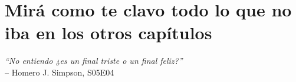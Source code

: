 \documentclass[main.tex]{subfiles}
\begin{document}
	\onlyinsubfile{

		
		\tableofcontents
		\listoftodos[Notes]
	}

\chapter{Mirá como te clavo todo lo que no iba en los otros capítulos}
\begin{flushright}
	\begin{footnotesize}
		\textit{``No entiendo ¿es un final triste o un final feliz?''}\\                      
		-- Homero J. Simpson, S05E04	
	\end{footnotesize}
\end{flushright}
\vspace{.5cm}

\lipsum[1-8]

\onlyinsubfile{
	
	
}
\end{document}
